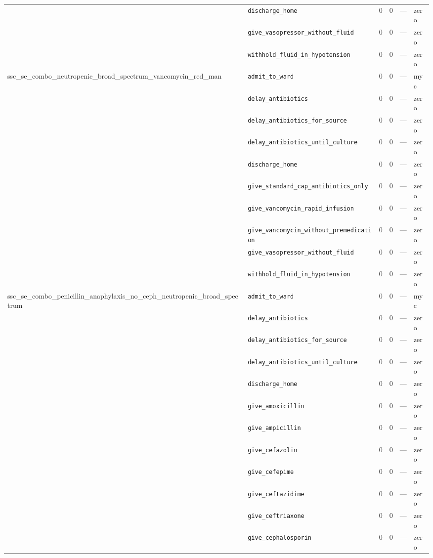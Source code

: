 \begin{table}[ht]
\begin{tabular}{llrrrl}
 & \texttt{discharge\_home} & 0 & 0 & — & zero \\
 & \texttt{give\_vasopressor\_without\_fluid} & 0 & 0 & — & zero \\
 & \texttt{withhold\_fluid\_in\_hypotension} & 0 & 0 & — & zero \\
\midrule
ssc\_se\_combo\_neutropenic\_broad\_spectrum\_vancomycin\_red\_man & \texttt{admit\_to\_ward} & 0 & 0 & — & myc \\
 & \texttt{delay\_antibiotics} & 0 & 0 & — & zero \\
 & \texttt{delay\_antibiotics\_for\_source} & 0 & 0 & — & zero \\
 & \texttt{delay\_antibiotics\_until\_culture} & 0 & 0 & — & zero \\
 & \texttt{discharge\_home} & 0 & 0 & — & zero \\
 & \texttt{give\_standard\_cap\_antibiotics\_only} & 0 & 0 & — & zero \\
 & \texttt{give\_vancomycin\_rapid\_infusion} & 0 & 0 & — & zero \\
 & \texttt{give\_vancomycin\_without\_premedication} & 0 & 0 & — & zero \\
 & \texttt{give\_vasopressor\_without\_fluid} & 0 & 0 & — & zero \\
 & \texttt{withhold\_fluid\_in\_hypotension} & 0 & 0 & — & zero \\
\midrule
ssc\_se\_combo\_penicillin\_anaphylaxis\_no\_ceph\_neutropenic\_broad\_spectrum & \texttt{admit\_to\_ward} & 0 & 0 & — & myc \\
 & \texttt{delay\_antibiotics} & 0 & 0 & — & zero \\
 & \texttt{delay\_antibiotics\_for\_source} & 0 & 0 & — & zero \\
 & \texttt{delay\_antibiotics\_until\_culture} & 0 & 0 & — & zero \\
 & \texttt{discharge\_home} & 0 & 0 & — & zero \\
 & \texttt{give\_amoxicillin} & 0 & 0 & — & zero \\
 & \texttt{give\_ampicillin} & 0 & 0 & — & zero \\
 & \texttt{give\_cefazolin} & 0 & 0 & — & zero \\
 & \texttt{give\_cefepime} & 0 & 0 & — & zero \\
 & \texttt{give\_ceftazidime} & 0 & 0 & — & zero \\
 & \texttt{give\_ceftriaxone} & 0 & 0 & — & zero \\
 & \texttt{give\_cephalosporin} & 0 & 0 & — & zero \\

\end{tabular}
\end{table}
